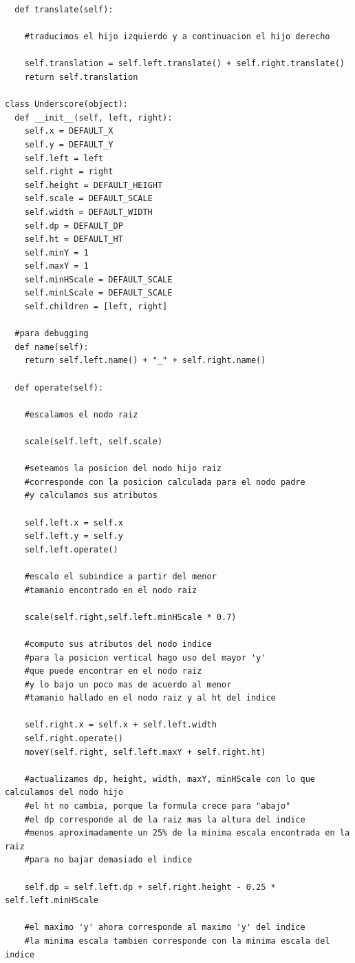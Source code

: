 \begin{verbatim}
  def translate(self):

    #traducimos el hijo izquierdo y a continuacion el hijo derecho

    self.translation = self.left.translate() + self.right.translate()
    return self.translation

class Underscore(object):
  def __init__(self, left, right):
    self.x = DEFAULT_X
    self.y = DEFAULT_Y
    self.left = left
    self.right = right
    self.height = DEFAULT_HEIGHT
    self.scale = DEFAULT_SCALE
    self.width = DEFAULT_WIDTH
    self.dp = DEFAULT_DP
    self.ht = DEFAULT_HT
    self.minY = 1
    self.maxY = 1
    self.minHScale = DEFAULT_SCALE
    self.minLScale = DEFAULT_SCALE
    self.children = [left, right]
    
  #para debugging
  def name(self):
    return self.left.name() + "_" + self.right.name()

  def operate(self):

    #escalamos el nodo raiz

    scale(self.left, self.scale)

    #seteamos la posicion del nodo hijo raiz
    #corresponde con la posicion calculada para el nodo padre
    #y calculamos sus atributos

    self.left.x = self.x
    self.left.y = self.y
    self.left.operate()

    #escalo el subindice a partir del menor 
    #tamanio encontrado en el nodo raiz

    scale(self.right,self.left.minHScale * 0.7)

    #computo sus atributos del nodo indice
    #para la posicion vertical hago uso del mayor 'y' 
    #que puede encontrar en el nodo raiz
    #y lo bajo un poco mas de acuerdo al menor 
    #tamanio hallado en el nodo raiz y al ht del indice

    self.right.x = self.x + self.left.width
    self.right.operate()
    moveY(self.right, self.left.maxY + self.right.ht)

    #actualizamos dp, height, width, maxY, minHScale con lo que calculamos del nodo hijo
    #el ht no cambia, porque la formula crece para "abajo"
    #el dp corresponde al de la raiz mas la altura del indice 
    #menos aproximadamente un 25% de la minima escala encontrada en la raiz
    #para no bajar demasiado el indice

    self.dp = self.left.dp + self.right.height - 0.25 * self.left.minHScale

    #el maximo 'y' ahora corresponde al maximo 'y' del indice
    #la minima escala tambien corresponde con la minima escala del indice


\end{verbatim}
